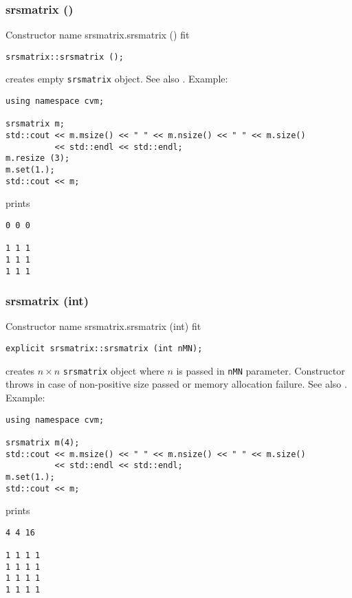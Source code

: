 \subsubsection{srsmatrix ()}
Constructor%
\pdfdest name {srsmatrix.srsmatrix ()} fit
\begin{verbatim}
srsmatrix::srsmatrix ();
\end{verbatim}
creates  empty \verb"srsmatrix" object.
See also .
Example:
\begin{Verbatim}
using namespace cvm;

srsmatrix m;
std::cout << m.msize() << " " << m.nsize() << " " << m.size()
          << std::endl << std::endl;
m.resize (3);
m.set(1.);
std::cout << m;
\end{Verbatim}
prints
\begin{Verbatim}
0 0 0

1 1 1
1 1 1
1 1 1
\end{Verbatim}
\newpage




\subsubsection{srsmatrix (int)}
Constructor%
\pdfdest name {srsmatrix.srsmatrix (int)} fit
\begin{verbatim}
explicit srsmatrix::srsmatrix (int nMN);
\end{verbatim}
creates  $n\times n$ \verb"srsmatrix" object where $n$ is passed in
\verb"nMN" parameter. 
Constructor throws  
in case of non-positive size passed or memory allocation failure.
See also .
Example:
\begin{Verbatim}
using namespace cvm;

srsmatrix m(4);
std::cout << m.msize() << " " << m.nsize() << " " << m.size()
          << std::endl << std::endl;
m.set(1.);
std::cout << m;
\end{Verbatim}
prints
\begin{Verbatim}
4 4 16

1 1 1 1
1 1 1 1
1 1 1 1
1 1 1 1
\end{Verbatim}
\newpage




